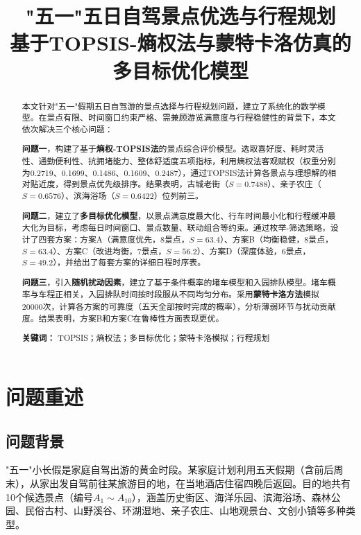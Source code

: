 \documentclass[12pt,a4paper]{ctexart}
\title{\heiti\zihao{2} "五一"五日自驾景点优选与行程规划\\[6pt]
\large 基于TOPSIS-熵权法与蒙特卡洛仿真的多目标优化模型}
\author{}
\date{}
\begin{document}
\maketitle
\thispagestyle{empty}

\begin{abstract}
\noindent
本文针对"五一"假期五日自驾游的景点选择与行程规划问题，建立了系统化的数学模型。在景点有限、时间窗口约束严格、需兼顾游览满意度与行程稳健性的背景下，本文依次解决三个核心问题：

\textbf{问题一}，构建了基于\textbf{熵权-TOPSIS法}的景点综合评价模型。选取喜好度、耗时灵活性、通勤便利性、抗拥堵能力、整体舒适度五项指标，利用熵权法客观赋权（权重分别为0.2719、0.1699、0.1486、0.1609、0.2487），通过TOPSIS法计算各景点与理想解的相对贴近度，得到景点优先级排序。结果表明，古城老街（$S=0.7488$）、亲子农庄（$S=0.6576$）、滨海浴场（$S=0.6422$）位列前三。

\textbf{问题二}，建立了\textbf{多目标优化模型}，以景点满意度最大化、行车时间最小化和行程缓冲最大化为目标，考虑每日时间窗口、景点数量、联动组合等约束。通过枚举-筛选策略，设计了四套方案：方案A（满意度优先，8景点，$S=63.4$）、方案B（均衡稳健，8景点，$S=63.4$）、方案C（改进均衡，7景点，$S=56.2$）、方案D（深度体验，6景点，$S=49.2$），并给出了每套方案的详细日程时序表。

\textbf{问题三}，引入\textbf{随机扰动因素}，建立了基于条件概率的堵车模型和入园排队模型。堵车概率与车程正相关，入园排队时间按时段服从不同均匀分布。采用\textbf{蒙特卡洛方法}模拟20000次，计算各方案的可靠度（五天全部按时完成的概率），分析薄弱环节与扰动贡献度。结果表明，方案B和方案C在鲁棒性方面表现更优。

\vspace{6pt}
\noindent\textbf{关键词：} TOPSIS；熵权法；多目标优化；蒙特卡洛模拟；行程规划
\end{abstract}

\newpage
\setcounter{page}{1}

\section{问题重述}

\subsection{问题背景}

"五一"小长假是家庭自驾出游的黄金时段。某家庭计划利用五天假期（含前后周末），从家出发自驾前往某旅游目的地，在当地酒店住宿四晚后返回。目的地共有10个候选景点（编号$A_1 \sim A_{10}$），涵盖历史街区、海洋乐园、滨海浴场、森林公园、民俗古村、山野溪谷、环湖湿地、亲子农庄、山地观景台、文创小镇等多种类型。
\end{document}
